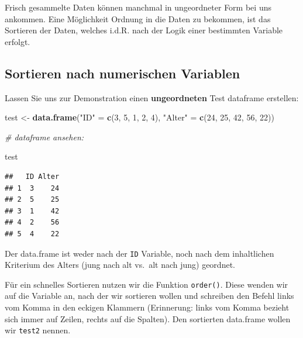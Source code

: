 \documentclass[
]{book}
\newenvironment{Shaded}{\begin{snugshade}}{\end{snugshade}}
\newcommand{\CommentTok}[1]{\textcolor[rgb]{0.56,0.35,0.01}{\textit{#1}}}
\newcommand{\DecValTok}[1]{\textcolor[rgb]{0.00,0.00,0.81}{#1}}
\newcommand{\FunctionTok}[1]{\textcolor[rgb]{0.13,0.29,0.53}{\textbf{#1}}}
\newcommand{\NormalTok}[1]{#1}
\newcommand{\OtherTok}[1]{\textcolor[rgb]{0.56,0.35,0.01}{#1}}
\newcommand{\SpecialCharTok}[1]{\textcolor[rgb]{0.81,0.36,0.00}{\textbf{#1}}}
\newcommand{\StringTok}[1]{\textcolor[rgb]{0.31,0.60,0.02}{#1}}
\begin{document}
Frisch gesammelte Daten können manchmal in ungeordneter Form bei uns ankommen. Eine Möglichkeit Ordnung in die Daten zu bekommen, ist das Sortieren der Daten, welches i.d.R. nach der Logik einer bestimmten Variable erfolgt.

\subsection{Sortieren nach numerischen Variablen}\label{sortieren-nach-numerischen-variablen}

Lassen Sie uns zur Demonstration einen \textbf{ungeordneten} Test dataframe erstellen:

\begin{Shaded}
\begin{Highlighting}[]
\NormalTok{test }\OtherTok{\textless{}{-}} \FunctionTok{data.frame}\NormalTok{(}\StringTok{"ID"} \OtherTok{=} \FunctionTok{c}\NormalTok{(}\DecValTok{3}\NormalTok{, }\DecValTok{5}\NormalTok{, }\DecValTok{1}\NormalTok{, }\DecValTok{2}\NormalTok{, }\DecValTok{4}\NormalTok{),}
                     \StringTok{"Alter"} \OtherTok{=} \FunctionTok{c}\NormalTok{(}\DecValTok{24}\NormalTok{, }\DecValTok{25}\NormalTok{, }\DecValTok{42}\NormalTok{, }\DecValTok{56}\NormalTok{, }\DecValTok{22}\NormalTok{))}

\CommentTok{\# dataframe ansehen:}

\NormalTok{test}
\end{Highlighting}
\end{Shaded}

\begin{verbatim}
##   ID Alter
## 1  3    24
## 2  5    25
## 3  1    42
## 4  2    56
## 5  4    22
\end{verbatim}

Der data.frame ist weder nach der \texttt{ID} Variable, noch nach dem inhaltlichen Kriterium des Alters (jung nach alt vs.~alt nach jung) geordnet.

Für ein schnelles Sortieren nutzen wir die Funktion \texttt{order()}. Diese wenden wir auf die Variable an, nach der wir sortieren wollen und schreiben den Befehl links vom Komma in den eckigen Klammern (Erinnerung: links vom Komma bezieht sich immer auf Zeilen, rechts auf die Spalten). Den sortierten data.frame wollen wir \texttt{test2} nennen.

\begin{Shaded}
\end{Shaded}
\end{document}

